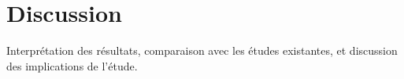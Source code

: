 \section{Discussion}
Interprétation des résultats, comparaison avec les études existantes, et discussion des implications de l'étude.
